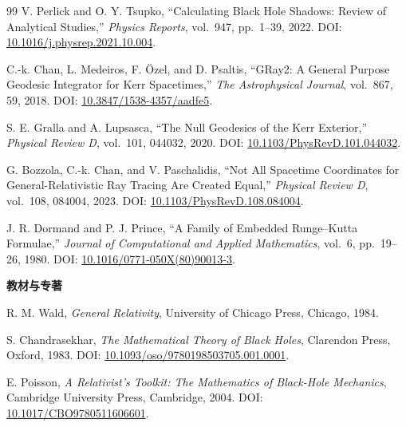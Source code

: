 \documentclass[UTF8,11pt,a4paper,fontset=fandol]{ctexart}
\begin{document}
\begin{thebibliography}{99}
V. Perlick and O. Y. Tsupko, ``Calculating Black Hole Shadows: Review of Analytical Studies,'' \emph{Physics Reports}, vol.~947, pp.~1--39, 2022. DOI: \href{https://doi.org/10.1016/j.physrep.2021.10.004}{10.1016/j.physrep.2021.10.004}.

C.-k. Chan, L. Medeiros, F. \"Ozel, and D. Psaltis, ``GRay2: A General Purpose Geodesic Integrator for Kerr Spacetimes,'' \emph{The Astrophysical Journal}, vol.~867, 59, 2018. DOI: \href{https://doi.org/10.3847/1538-4357/aadfe5}{10.3847/1538-4357/aadfe5}.

S. E. Gralla and A. Lupsasca, ``The Null Geodesics of the Kerr Exterior,'' \emph{Physical Review D}, vol.~101, 044032, 2020. DOI: \href{https://doi.org/10.1103/PhysRevD.101.044032}{10.1103/PhysRevD.101.044032}.

G. Bozzola, C.-k. Chan, and V. Paschalidis, ``Not All Spacetime Coordinates for General-Relativistic Ray Tracing Are Created Equal,'' \emph{Physical Review D}, vol.~108, 084004, 2023. DOI: \href{https://doi.org/10.1103/PhysRevD.108.084004}{10.1103/PhysRevD.108.084004}.

J. R. Dormand and P. J. Prince, ``A Family of Embedded Runge--Kutta Formulae,'' \emph{Journal of Computational and Applied Mathematics}, vol.~6, pp.~19--26, 1980. DOI: \href{https://doi.org/10.1016/0771-050X(80)90013-3}{10.1016/0771-050X(80)90013-3}.

\item[]\textbf{教材与专著}

R. M. Wald, \emph{General Relativity}, University of Chicago Press, Chicago, 1984.

S. Chandrasekhar, \emph{The Mathematical Theory of Black Holes}, Clarendon Press, Oxford, 1983. DOI: \href{https://doi.org/10.1093/oso/9780198503705.001.0001}{10.1093/oso/9780198503705.001.0001}.

E. Poisson, \emph{A Relativist's Toolkit: The Mathematics of Black-Hole Mechanics}, Cambridge University Press, Cambridge, 2004. DOI: \href{https://doi.org/10.1017/CBO9780511606601}{10.1017/CBO9780511606601}.

\end{thebibliography}
\end{document}
